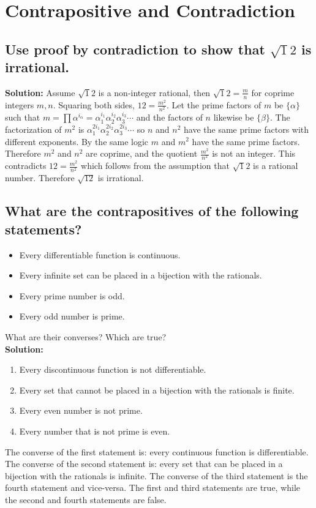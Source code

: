 \documentclass{article}
\newcommand{\exercise}[1]{\subsection{\normalfont #1}}
\newcommand{\solution}{\indent\indent \textbf{Solution: }}
\begin{document}
\section{Contrapositive and Contradiction}
\exercise{Use proof by contradiction to show that $\sqrt 12$ is irrational.}
\solution
Assume $\sqrt12$ is a non-integer rational, then $\sqrt 12 = \frac{m}{n}$ for coprime integers $m, n$. Squaring both sides, $12 = \frac{m^2}{n^2}$. Let the prime factors of $m$ be $\{\alpha\}$ such that $m = \prod\alpha^{i_\alpha} = \alpha_1^{i_1} \alpha_2^{i_2} \alpha_3^{i_3} \dotsb$ and the factors of $n$ likewise be $\{\beta\}$. The factorization of $m^2$ is $\alpha_1^{2i_1}\alpha_2^{2i_2}\alpha_3^{2i_3}\dotsb$ so $n$ and $n^2$ have the same prime factors with different exponents. By the same logic $m$ and $m^2$ have the same prime factors. Therefore $m^2$ and $n^2$ are coprime, and the quotient $\frac{m^2}{n^2}$ is not an integer. This contradicts $12 = \frac{m^2}{n^2}$ which follows from the assumption that $\sqrt 12$ is a rational number. Therefore $\sqrt{12}$ is irrational.

\exercise{What are the contrapositives of the following statements?}
\begin{itemize}
\item Every differentiable function is continuous.
\item Every infinite set can be placed in a bijection with the rationals.
\item Every prime number is odd.
\item Every odd number is prime.
\end{itemize}
What are their converses? Which are true?\\

\solution
\begin{enumerate}
\item Every discontinuous function is not differentiable.
\item Every set that cannot be placed in a bijection with the rationals is finite.
\item Every even number is not prime.
\item Every number that is not prime is even. 
\end{enumerate}

The converse of the first statement is: every continuous function is differentiable. The converse of the second statement is: every set that can be placed in a bijection with the rationals is infinite. The converse of the third statement is the fourth statement and vice-versa. The first and third statements are true, while the second and fourth statements are false. 
 
\end{document}
